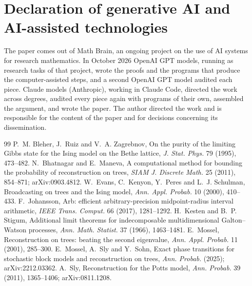 \documentclass[11pt]{amsart}
\theoremstyle{definition}
\theoremstyle{remark}
\begin{document}
\section*{Declaration of generative AI and AI-assisted technologies}
The paper comes out of Math Brain, an ongoing project on the use of AI systems for research mathematics. In
October 2026 OpenAI GPT models, running as research tasks of that project, wrote the proofs and the programs that
produce the computer-assisted steps, and a second OpenAI GPT model audited each piece. Claude models (Anthropic),
working in Claude Code, directed the work across degrees, audited every piece again with programs of their own,
assembled the argument, and wrote the paper. The author directed the work and is responsible for the content of the
paper and for decisions concerning its dissemination.

\begin{thebibliography}{99}
 P.~M. Bleher, J.~Ruiz and V.~A. Zagrebnov, On the purity of the limiting Gibbs state for
the Ising model on the Bethe lattice, \emph{J. Stat. Phys.} 79 (1995), 473--482.
 N.~Bhatnagar and E.~Maneva, A computational method for bounding the probability of
reconstruction on trees, \emph{SIAM J. Discrete Math.} 25 (2011), 854--871; arXiv:0903.4812.
 W.~Evans, C.~Kenyon, Y.~Peres and L.~J. Schulman, Broadcasting on trees and the Ising
model, \emph{Ann. Appl. Probab.} 10 (2000), 410--433.
 F.~Johansson, Arb: efficient arbitrary-precision midpoint-radius interval arithmetic,
\emph{IEEE Trans. Comput.} 66 (2017), 1281--1292.
 H.~Kesten and B.~P. Stigum, Additional limit theorems for indecomposable multidimensional
Galton--Watson processes, \emph{Ann. Math. Statist.} 37 (1966), 1463--1481.
 E.~Mossel, Reconstruction on trees: beating the second eigenvalue, \emph{Ann. Appl.
Probab.} 11 (2001), 285--300.
 E.~Mossel, A.~Sly and Y.~Sohn, Exact phase transitions for stochastic block models and
reconstruction on trees, \emph{Ann. Probab.} (2025); arXiv:2212.03362.
 A.~Sly, Reconstruction for the Potts model, \emph{Ann. Probab.} 39 (2011), 1365--1406;
arXiv:0811.1208.
\end{thebibliography}
\end{document}
